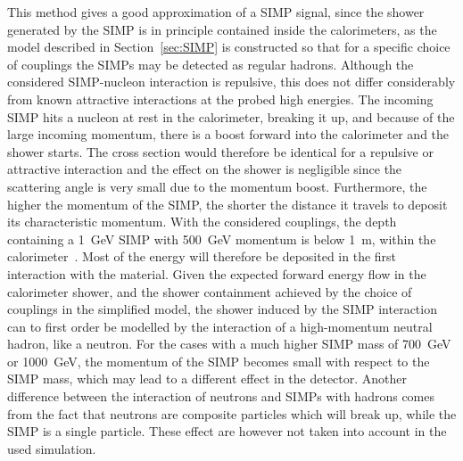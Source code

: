 This method gives a good approximation of a \ac{SIMP} signal, since the shower generated by the \ac{SIMP} is in principle contained inside the calorimeters, as the model described in Section~\ref{sec:SIMP} is constructed so that for a specific choice of couplings the \acp{SIMP} may be detected as regular hadrons. Although the considered \ac{SIMP}-nucleon interaction is repulsive, this does not differ considerably from known attractive interactions at the probed high energies. The incoming \ac{SIMP} hits a nucleon at rest in the calorimeter, breaking it up, and because of the large incoming momentum, there is a boost forward into the calorimeter and the shower starts. The cross section would therefore be identical for a repulsive or attractive interaction and the effect on the shower is negligible since the scattering angle is very small due to the momentum boost. Furthermore, the higher the momentum of the \ac{SIMP}, the shorter the distance it travels to deposit its characteristic momentum. With the considered couplings, the depth containing a \SI{1}{GeV} \ac{SIMP} with \SI{500}{GeV} momentum is below \SI{1}{m}, within the calorimeter~\cite{Bryan}. Most of the energy will therefore be deposited in the first interaction with the material. Given the expected forward energy flow in the calorimeter shower, and the shower containment achieved by the choice of couplings in the simplified model, the shower induced by the \ac{SIMP} interaction can to first order be modelled by the interaction of a high-momentum neutral hadron, like a neutron. For the cases with a much higher \ac{SIMP} mass of \SI{700}{GeV} or \SI{1000}{GeV}, the momentum of the SIMP becomes small with respect to the \ac{SIMP} mass, which may lead to a different effect in the detector. Another difference between the interaction of neutrons and \acp{SIMP} with hadrons comes from the fact that neutrons are composite particles which will break up, while the \ac{SIMP} is a single particle. These effect are however not taken into account in the used simulation.

\clearpage
\clearpage{\pagestyle{empty}\cleardoublepage}

